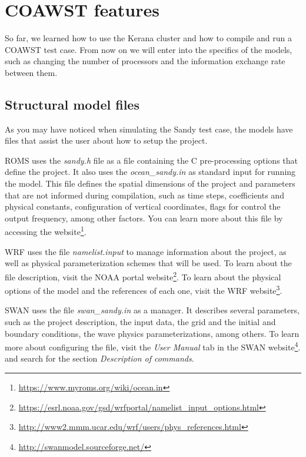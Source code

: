 \chapter{COAWST features}
\bigskip
 So far, we learned how to use the Kerana cluster and how to compile and run a COAWST test case.
From now on we will enter into the specifics of the models, such as changing the number of processors
and the information exchange rate between them.
\bigskip

\section{Structural model files}
\bigskip

 As you may have noticed when simulating the Sandy test case, the models have files that assist the user about how to setup the project.

\bigskip

 ROMS uses the \textit{sandy.h} file as a file containing the C pre-processing options that define the project. 
 It also uses the \textit{ocean\_sandy.in} as standard input for
running the model. This file defines the spatial dimensions of the project and parameters that are not informed during compilation,
such as time steps, coefficients and physical constants, configuration of vertical coordinates, flags for
control the output frequency, among other factors. You can learn more about this file by accessing the
website\textcolor{bleu_cite}{\textit{}\footnote{\textcolor{bleu_cite}{\href{https://www.myroms.org/wiki/ocean.in}{https://www.myroms.org/wiki/ocean.in}}}}.
\bigskip

 WRF uses the file \textit{namelist.input} to manage information about the project, as well as
physical parameterization schemes that will be used. To learn about the file description,
visit the NOAA portal website\textcolor{bleu_cite}{\textit{}\footnote{\textcolor{bleu_cite}{\href{https://esrl.noaa.gov/gsd/wrfportal/namelist\_input\_options.html}{https://esrl.noaa.gov/gsd/wrfportal/namelist\_input\_options.html}}}}.
To learn about the physical options of the model and the references of each one, visit the
WRF website\textcolor{bleu_cite}{\textit{}\footnote{\textcolor{bleu_cite}{\href{http://www2.mmm.ucar.edu/wrf/users/phys\_references.html}{http://www2.mmm.ucar.edu/wrf/users/phys\_references.html}}}}.
\bigskip

 SWAN uses the file \textit{swan\_sandy.in} as a manager. It describes several parameters,
such as the project description, the input data, the grid and the initial and boundary conditions, the
wave physics parameterizations, among others. To learn more about configuring the file, visit the \textit{User Manual} tab
in the SWAN website\textcolor{bleu_cite}{\textit{}\footnote{\textcolor{bleu_cite}{\href{http://swanmodel.sourceforge.net/}{http://swanmodel.sourceforge.net/}}}}.
and search for the section \textit{Description of commands}.
\bigskip

